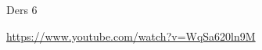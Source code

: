 \documentclass[12pt,fleqn]{article}\usepackage{../../common}
\begin{document}
Ders 6

















\url{https://www.youtube.com/watch?v=WqSa620ln9M}
\end{document}
